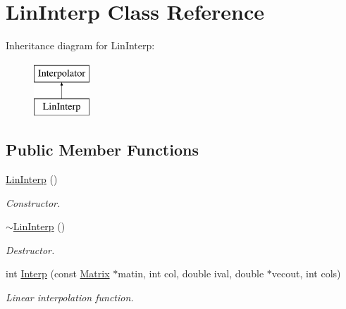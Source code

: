 \hypertarget{classLinInterp}{
\section{LinInterp Class Reference}
\label{d8/dee/classLinInterp}
}
Inheritance diagram for LinInterp:\begin{figure}[H]
\begin{center}
\leavevmode
\includegraphics[height=2cm]{d8/dee/classLinInterp}
\end{center}
\end{figure}
\subsection*{Public Member Functions}
\begin{DoxyCompactItemize}
\item 
\hypertarget{classLinInterp_a56a58464dae6196cc671749133f1de12}{
\hyperlink{classLinInterp_a56a58464dae6196cc671749133f1de12}{LinInterp} ()}
\label{d8/dee/classLinInterp_a56a58464dae6196cc671749133f1de12}

\begin{DoxyCompactList}\small\item\em Constructor. \item\end{DoxyCompactList}\item 
\hypertarget{classLinInterp_a301177227b3013bcf9ea45e1c66fc468}{
\hyperlink{classLinInterp_a301177227b3013bcf9ea45e1c66fc468}{$\sim$LinInterp} ()}
\label{d8/dee/classLinInterp_a301177227b3013bcf9ea45e1c66fc468}

\begin{DoxyCompactList}\small\item\em Destructor. \item\end{DoxyCompactList}\item 
int \hyperlink{classLinInterp_a26aeb03c387bf5c8ea5db0ed111b5cd7}{Interp} (const \hyperlink{classMatrix}{Matrix} $\ast$matin, int col, double ival, double $\ast$vecout, int cols)
\begin{DoxyCompactList}\small\item\em Linear interpolation function. \item\end{DoxyCompactList}\end{DoxyCompactItemize}


